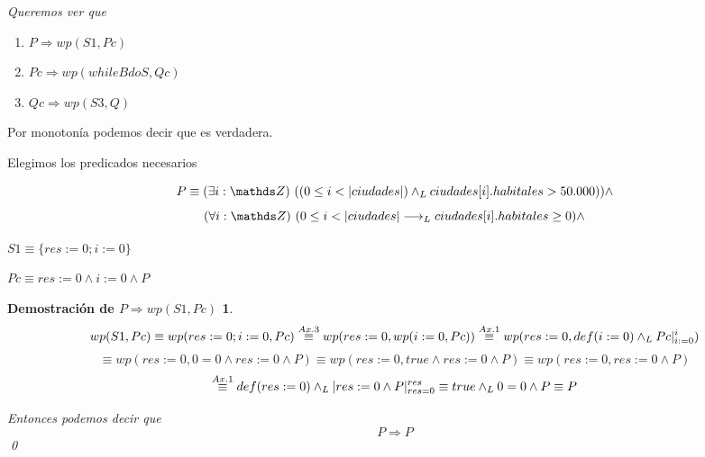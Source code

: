 \documentclass[10pt,a4paper]{article}
\begin{document}
\textit{Queremos ver que}
\begin{enumerate} \setlength\itemsep{0cm}
	\item $P \Longrightarrow wp(S1, Pc)$
	\item $Pc \Longrightarrow wp(while B do S, Qc)$
	\item $Qc \Longrightarrow wp(S3, Q)$
\end{enumerate}

Por monotonía podemos decir que  es verdadera.

\vspace{0.3 cm}

Elegimos los predicados necesarios

\[P \equiv  \existe[unalinea]{i}{\ent}{(0 \leq i < |ciudades|) \yLuego ciudades[i].habitales > 50.000)}  \land \]
	\[ \paraTodo[unalinea]{i}{\ent}{0 \leq i <|ciudades|\implicaLuego ciudades[i].habitales \geq 0} \land \] \par

\vspace{0.2cm}
$S1 \equiv \{res:=0;i:=0\}$ \par
\vspace{0.2cm}
$Pc \equiv res:=0 \land i:=0 \land P$
	
\newtheorem*{demoP}{Demostración de  $P \Longrightarrow wp(S1, Pc)$}
\newtheorem*{demoPc}{Demostración de  $P_{c} \Longrightarrow wp(while B do S, Q_{c})$}
\begin{demoP}

	\[
	wp(S1,Pc) \equiv wp(res:=0;i:=0, Pc) \overset{\scriptsize Ax. 3}{\equiv} wp(res:=0,wp(i:=0,Pc)) \overset{\scriptsize Ax. 1}{\equiv} wp(res:=0, def(i:=0) \land _L Pc|_{i:=0}^{i}) 
	\]
	\[
	\equiv wp(res:=0, 0=0 \land res:=0 \land P) \equiv wp(res:=0,true \land res:=0 \land P)\equiv wp(res:=0,res:=0 \land P)
	\]
	\[
	\overset{\scriptsize Ax. 1}{\equiv} def(res:=0) \land _L |res:=0 \land P|_{res=0}^{res} \equiv  true \land _L 0=0 \land P \equiv P
	\]
	\begin{center}
		Entonces  podemos  decir  que
		\[P \Longrightarrow P\]	\qed
	\end{center}

\end{demoP}
\end{document}
